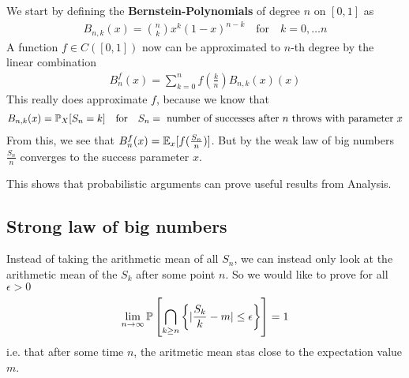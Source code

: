We start by defining the \textbf{Bernstein-Polynomials} of degree $n$ on $[0,1]$ as
\begin{align*}
  B_{n,k}(x) = \binom{n}{k}x^{k}(1-x)^{n-k} \quad \text{for} \quad k = 0, \ldots n
\end{align*}
A function $f \in C([0,1])$ now can be approximated to $n$-th degree by the linear combination
\begin{align*}
  B_n^{f}(x) = \sum_{k=0}^{n}f(\tfrac{k}{n})B_{n,k}(x)(x)
\end{align*}
This really does approximate $f$, because we know that 
\begin{align*}
  B_{n,k}(x) = \mathbb{P}_X[S_n = k] \quad \text{for} \quad S_n = \text{ number of successes after $n$ throws with parameter $x$}
\end{align*}
From this, we see that $B_n^{f}(x) = \mathbb{E}_x[f(\tfrac{S_n}{n})]$.
But by the weak law of big numbers $\tfrac{S_n}{n}$ converges to the success parameter $x$.

This shows that probabilistic arguments can prove useful results from Analysis.

\subsection{Strong law of big numbers}
Instead of taking the arithmetic mean of all $S_n$, we can instead only look at the arithmetic mean of the $S_k$ after some point $n$. 
So we would like to prove for all $\epsilon > 0$
\begin{align*}
  \lim_{n \to \infty}\mathbb{P} \left[\bigcap_{k \geq n} \left\{\vert\frac{S_k}{k} - m\vert \leq \epsilon\right\}\right] = 1
\end{align*}
i.e. that after some time $n$, the aritmetic mean stas close to the expectation value $m$.

